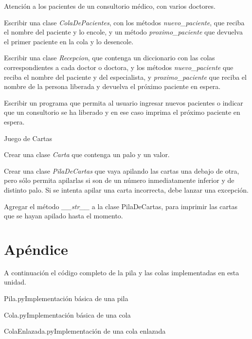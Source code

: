 \begin{ejercicio}
Atención a los pacientes de un consultorio médico, con varios doctores.
\begin{partes}
    \item Escribir una clase {\it ColaDePacientes}, con los métodos {\it
nuevo\_paciente}, que reciba el nombre del paciente y lo encole, y un
método {\it proximo\_paciente} que devuelva el primer paciente en la cola y
lo desencole.
    \item Escribir una clase {\it Recepcion}, que contenga un diccionario con
las colas correspondientes a cada doctor o doctora, y los métodos {\it
nuevo\_paciente} que reciba el nombre del paciente y del especialista, y
{\it proximo\_paciente} que reciba el nombre de la persona liberada y
devuelva el próximo paciente en espera.
    \item Escribir un programa que permita al usuario ingresar nuevos pacientes
o indicar que un consultorio se ha liberado y en ese caso imprima el
próximo paciente en espera.
\end{partes}
\end{ejercicio}


\begin{ejercicio}
Juego de Cartas
\begin{partes}
    \item Crear una clase {\it Carta} que contenga un palo y un valor.
    \item Crear una clase {\it PilaDeCartas} que vaya apilando las cartas una
debajo de otra, pero sólo permita apilarlas si son de un número
inmediatamente inferior y de distinto palo. Si se intenta apilar una carta
incorrecta, debe lanzar una excepción.
    \item Agregar el método {\it \_\_str\_\_} a la clase PilaDeCartas, para
imprimir las cartas que se hayan apilado hasta el momento.
\end{partes}
\end{ejercicio}

\newpage
\section{Apéndice}

A continuación el código completo de la pila y las colas implementadas en
esta unidad.

\begin{codigo}{Pila.py}{Implementación básica de una pila}

\end{codigo}

\begin{codigo}{Cola.py}{Implementación básica de una cola}

\end{codigo}

\begin{codigo}{ColaEnlazada.py}{Implementación de una cola enlazada}

\end{codigo}

